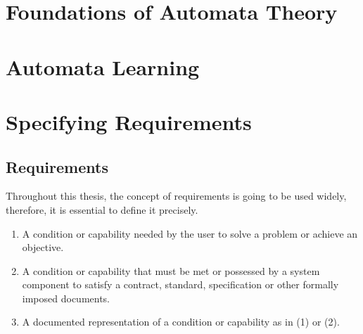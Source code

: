 \section{Foundations of Automata Theory} \label{sec_backgrmodeling}






\section{Automata Learning} \label{sec_backgrautomatalearning}



\section{Specifying Requirements} \label{sec_backgrspecreq}

\subsection{Requirements} \label{subs_backgrreq}

Throughout this thesis, the concept of requirements is going to be used widely, therefore, it is essential to define it precisely. 

\begin{definition}
	\mbox{}
	\begin{enumerate}
		\setlength\itemsep{0.1em}
		\item A condition or capability needed by the user to solve a problem or achieve an objective.
		\item A condition or capability that must be met or possessed by a system component to satisfy a contract, standard, specification or other formally imposed documents.
		\item A documented representation of a condition or capability as in (1) or (2).
	\end{enumerate}
\end{definition}


